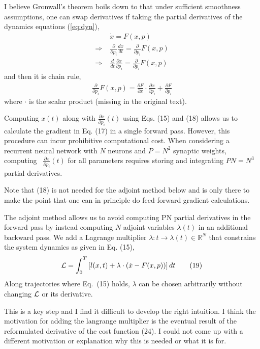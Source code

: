 \documentclass[a4paper]{article}
\newcommand{\blue}[1]{{\color{blue}#1}}
\newcommand{\R}{{\mathbb R}}
\begin{document}
I believe Gronwall's theorem boils down to that under sufficient
smoothness assumptions, one can swap derivatives if taking the partial
derivatives of the dynamics equations \blue{(\ref{eq:dyn})},
\begin{align}
 & \dot{x} = F(x,p) \\
\Rightarrow \; &\frac{\partial }{\partial p_i} \frac{d x}{dt} =
\frac{\partial }{\partial p_i} F(x,p) \\
\Rightarrow \; &\frac{d}{dt} \frac{\partial x}{\partial p_i} = \frac{\partial }{\partial p_i} F(x,p) 
\end{align}
and then it is chain rule,
\begin{align}
\frac{\partial }{\partial p_i} F(x,p) = \frac{\partial
      F}{\partial x} \cdot \frac{\partial x}{\partial p_i} + \frac{\partial
  F}{\partial p_i}
\end{align}
where $\cdot$ is the scalar product (missing in the original text).

\blue{Computing $x(t)$ along with $\frac{\partial x}{\partial p_i}
  (t)$ using Eqs. (15) and (18) allows us to calculate the gradient in
  Eq. (17) in a single forward pass. However, this procedure can incur
  prohibitive computational cost. When considering a recurrent 
 neural network with $N$ neurons and $P = N^2$ synaptic weights,
 computing  $\frac{\partial x}{\partial p_i} (t)$ for all parameters
 requires storing and integrating $PN = N^3$ partial derivatives.
}

Note that \blue{(18)} is not needed for the adjoint method below and is only
there to make the point that one can in principle do feed-forward
gradient calculations. 

\blue{
 The adjoint method allows us to avoid computing PN partial
 derivatives in the forward pass by instead computing
 $N$ adjoint variables $\lambda (t)$ in an additional backward
 pass. We add a Lagrange multiplier $\lambda: t  \rightarrow
  \lambda(t) \in \R^N$ that constrains the system dynamics as given in Eq. (15),
 \begin{align}
   {\cal L} = \int_0^T \left[ l(x,t) + \lambda \cdot \left(\dot{x} -
     F(x,p)\right)\right] dt \tag{19}
 \end{align}
 Along trajectories where Eq.~(15) holds, $\lambda$ can be chosen arbitrarily
without changing $\cal L$ or its derivative.
}

This is a key step and I find it difficult to develop the right
intuition. I think the motivation for adding the langrange multiplier
is the eventual result of the reformulated derivative of the cost
function \blue{(24)}. I could not come up with a different motivation
or explanation why this is needed or what it is for.
\end{document}
